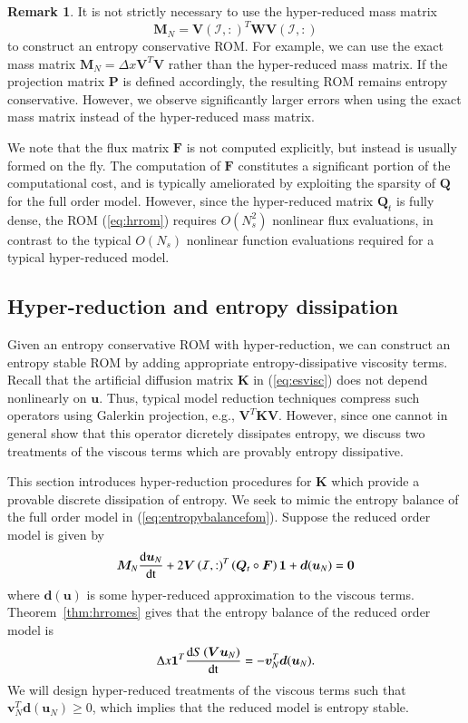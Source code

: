 \documentclass[preprint,10pt]{elsarticle}
\theoremstyle{definition}
\theoremstyle{lemma}
\newtheorem*{remark}{Remark}
\theoremstyle{theorem}
\theoremstyle{assumption}
\newcommand{\td}[2]{\frac{{\rm d}#1}{{\rm d}{\rm #2}}}
\newcommand{\LRp}[1]{\left( #1 \right)}
\begin{document}
\begin{remark}
It is not strictly necessary to use the hyper-reduced mass matrix 
\[
\bm{M}_N = \bm{V}\LRp{\mathcal{I},:}^T\bm{W}\bm{V}\LRp{\mathcal{I},:}
\]
 to construct an entropy conservative ROM.  For example, we can use the exact mass matrix $\bm{M}_N = \Delta x \bm{V}^T\bm{V}$ rather than the hyper-reduced mass matrix.  If the projection matrix $\bm{P}$ is defined accordingly, the resulting ROM remains entropy conservative.  However, we observe significantly larger errors when using the exact mass matrix instead of the hyper-reduced mass matrix.  
\end{remark}


We note that the flux matrix $\bm{F}$ is not computed explicitly, but instead is usually formed on the fly.  The computation of $\bm{F}$ constitutes a significant portion of the computational cost, and is typically ameliorated by exploiting the sparsity of $\bm{Q}$ for the full order model.  However, since the hyper-reduced matrix $\bm{Q}_t$ is fully dense, the ROM (\ref{eq:hrrom}) requires $O(N_s^2)$ nonlinear flux evaluations, in contrast to the typical $O(N_s)$ nonlinear function evaluations required for a typical hyper-reduced model.  


\subsection{Hyper-reduction and entropy dissipation}
\label{sec:diss}
Given an entropy conservative ROM with hyper-reduction, we can construct an entropy stable ROM by adding appropriate entropy-dissipative viscosity terms.  Recall that the artificial diffusion matrix $\bm{K}$ in (\ref{eq:esvisc}) does not depend nonlinearly on $\bm{u}$.  Thus, typical model reduction techniques compress such operators using Galerkin projection, e.g., $\bm{V}^T\bm{K}\bm{V}$.  However, since one cannot in general show that this operator dicretely dissipates entropy, we discuss two treatments of the viscous terms which are provably entropy dissipative.  

This section introduces hyper-reduction procedures for $\bm{K}$ which provide a provable discrete dissipation of entropy.  We seek to mimic the entropy balance of the full order model in (\ref{eq:entropybalancefom}).  Suppose the reduced order model is given by 
\[
\bm{M}_N\td{\bm{u}_N}{t} + 2\bm{V}\LRp{\mathcal{I},:}^T\LRp{\bm{Q}_t \circ \bm{F}}\bm{1} + \bm{d}(\bm{u}_N)= \bm{0}
\]
where $\bm{d}(\bm{u})$ is some hyper-reduced approximation to the viscous terms.  Theorem~\ref{thm:hrromes} gives that the entropy balance of the reduced order model is
\[
\Delta x \bm{1}^T\td{S\LRp{\bm{V}\bm{u}_N}}{t} = -\bm{v}_N^T\bm{d}(\bm{u}_N).
\]
We will design hyper-reduced treatments of the viscous terms such that $\bm{v}_N^T\bm{d}(\bm{u}_N) \geq 0$, which implies that the reduced model is entropy stable.  
\end{document}
